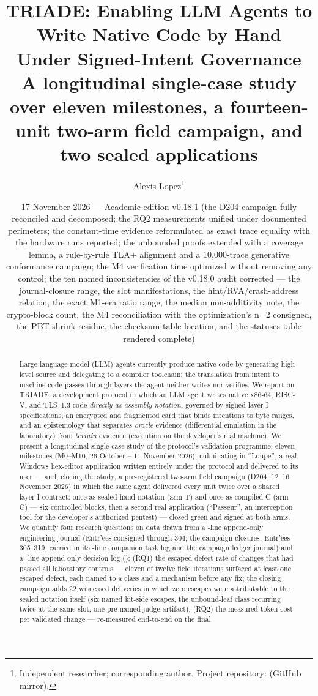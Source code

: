 \documentclass[11pt,a4paper]{article}
\title{\textbf{TRIADE: Enabling LLM Agents to Write Native Code by Hand\\
Under Signed-Intent Governance\\
\large A longitudinal single-case study over eleven milestones, a
fourteen-unit two-arm field campaign, and two sealed applications}}
\author{Alexis Lopez\thanks{Independent researcher; corresponding author.
Project repository: \code{alexisfrlopez-debug/triade} (GitHub mirror).}}
\date{17 November 2026 — Academic edition v0.18.1 (the D204 campaign fully reconciled and decomposed; the RQ2 measurements unified under documented perimeters; the constant-time evidence reformulated as exact trace equality with the hardware runs reported; the unbounded proofs extended with a coverage lemma, a rule-by-rule TLA+ alignment and a 10{,}000-trace generative conformance campaign; the M4 verification time optimized without removing any control; the ten named inconsistencies of the v0.18.0 audit corrected --- the journal-closure range, the slot manifestations, the hint/RVA/crash-address relation, the exact M1-era ratio range, the median non-additivity note, the crypto-block count, the M4 reconciliation with the optimization's n{=}2 consigned, the PBT shrink residue, the checksum-table location, and the statuses table rendered complete)}
\begin{document}
\maketitle
\thispagestyle{fancy}

\begin{abstract}
\noindent Large language model (LLM) agents currently produce native code by
generating high-level source and delegating to a compiler toolchain; the
translation from intent to machine code passes through layers the agent
neither writes nor verifies. We report on TRIADE, a development protocol in
which an LLM agent writes native x86-64, RISC-V, and TLS~1.3 code
\emph{directly as assembly notation}, governed by signed layer-I
specifications, an encrypted and fragmented card that binds intentions to
byte ranges, and an epistemology that separates \emph{oracle} evidence
(differential emulation in the laboratory) from \emph{terrain} evidence
(execution on the developer's real machine). We present a longitudinal
single-case study of the protocol's validation programme: eleven milestones
(M0--M10, 26 October -- 11 November 2026), culminating in ``Loupe'', a real
Windows hex-editor application written entirely under the protocol and
delivered to its user --- and, closing the study, a pre-registered
two-arm field campaign (D204, 12--16 November 2026) in which the same
agent delivered every unit twice over a shared layer-I contract: once
as sealed hand notation (arm T) and once as compiled C (arm C) --- six
controlled blocks, then a second real application (``Passeur'', an
interception tool for the developer's authorized pentest) --- closed
green and signed at both arms. We quantify four research questions on data drawn
from a \nbLignesJournal-line append-only engineering journal (Entr'ees
consigned through 304; the campaign closures, Entr'ees 305--319,
carried in its \nbLignesWorklog-line companion task log and the campaign
ledger journal) and a \nbLignesDecisions-line append-only decision log
(\plageDecisions): (RQ1) the
escaped-defect rate of changes that had passed all laboratory controls ---
eleven of twelve field iterations surfaced at least one escaped defect,
each named to a class and a mechanism before any fix; the closing
campaign adds 22 witnessed deliveries in which zero escapes were
attributable to the sealed notation itself (six named kit-side escapes,
the unbound-leaf class recurring twice at the same slot, one pre-named
judge artifact); (RQ2) the measured
token cost per validated change --- re-measured end-to-end on the final

\end{abstract}
\end{document}
